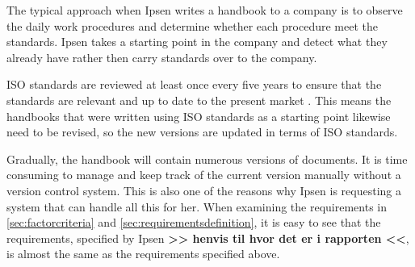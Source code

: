 The typical approach when Ipsen writes a handbook to a company is to observe the daily work procedures and determine whether each procedure meet the standards.
Ipsen takes a starting point in the company and detect what they already have rather then carry standards over to the company.


ISO standards are reviewed at least once every five years to ensure that the standards are relevant and up to date to the present market \cite{ISOreviewedevery5years}.
This means the handbooks that were written using ISO standards as a starting point likewise need to be revised, so the new versions are updated in terms of ISO standards.

Gradually, the handbook will contain numerous versions of documents.
It is time consuming to manage and keep track of the current version manually without a version control system.
This is also one of the reasons why Ipsen is requesting a system that can handle all this for her.
When examining the requirements in \cref{sec:factorcriteria} and \cref{sec:requirementsdefinition}, it is easy to see that the requirements, specified by Ipsen \textbf{>> henvis til hvor det er i rapporten <<}, is almost the same as the requirements specified above.

